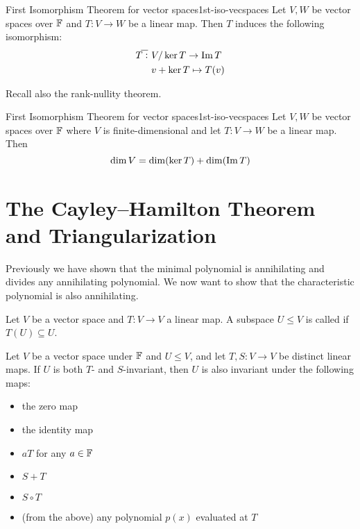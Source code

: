 \documentclass{styles/tufte}
\begin{document}
\begin{theorem}{First Isomorphism Theorem for vector spaces}{1st-iso-vecspaces}
  Let $V, W$ be vector spaces over $\mathbb{F}$ and $T: V \to W$ be a linear map. Then $T$ induces the following isomorphism:
  \begin{align*}
    \overline{T}:\ &V/\ker T \to \image T \\
    &v + \ker T \mapsto T(v)
  \end{align*}
\end{theorem}

Recall also the rank-nullity theorem.

\begin{theorem}{First Isomorphism Theorem for vector spaces}{1st-iso-vecspaces}
  Let $V, W$ be vector spaces over $\mathbb{F}$ where $V$ is finite-dimensional and let $T: V \to W$ be a linear map. Then
  \[ \dim V = \dim(\ker T) + \dim(\operatorname{Im} T) \]
\end{theorem}



\section{The Cayley--Hamilton Theorem and Triangularization}

Previously we have shown that the minimal polynomial is annihilating and divides any annihilating polynomial. We now want to show that the characteristic polynomial is also annihilating.

\begin{definition}{}{}
  Let $V$ be a vector space and $T: V \to V$ a linear map. A subspace $U \leqslant V$ is called  if $T(U) \subseteq U$.
\end{definition}

\begin{proposition}{}{}
  Let $V$ be a vector space under $\mathbb{F}$ and $U \leqslant V$, and let $T, S: V \to V$ be distinct linear maps. If $U$ is both $T$- and $S$-invariant, then $U$ is also invariant under the following maps:
  \begin{itemize}
    \item the zero map
    \item the identity map
    \item $aT$ for any $a \in \mathbb{F}$
    \item $S + T$
    \item $S \circ T$
    \item (from the above) any polynomial $p(x)$ evaluated at $T$
  \end{itemize}
\end{proposition}
\end{document}
